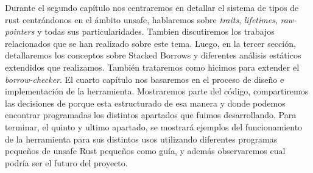 Durante el segundo capítulo nos centraremos en detallar el sistema de tipos de rust centrándonos en el ámbito unsafe, hablaremos sobre \textit{traits}, \textit{lifetimes}, \textit{raw-pointers} y todas sus particularidades. Tambien discutiremos los trabajos relacionados que se han realizado sobre este tema.
Luego, en la tercer sección, detallaremos los conceptos sobre Stacked Borrows \citep{stackedborrows} y diferentes análisis estáticos extendidos que realizamos. También trataremos como hicimos para extender el \textit{borrow-checker}.
El cuarto capítulo nos basaremos en el proceso de diseño e implementación de la herramienta. Mostraremos parte del código, compartiremos las decisiones de porque esta estructurado de esa manera y donde podemos encontrar programadas los distintos apartados que fuimos desarrollando.
Para terminar, el quinto y ultimo apartado, se mostrará ejemplos del funcionamiento de la herramienta para sus distintos usos utilizando diferentes programas pequeños de unsafe Rust pequeños como guía, y además observaremos cual podría ser el futuro del proyecto.